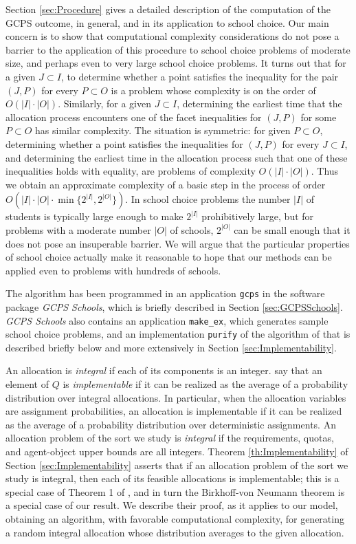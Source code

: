 \documentclass[12pt]{article}
\theoremstyle{definition}
\begin{document}
Section \ref{sec:Procedure} gives a detailed description of the computation of the GCPS outcome, in general, and in its application to school choice.  Our main concern is to show that computational complexity considerations do not pose a barrier to the application of this procedure to school choice problems of moderate size, and perhaps even to very large school choice problems.  
It turns out that for a given $J \subset I$, to determine whether a point satisfies the inequality for the pair $(J,P)$ for every $P \subset O$ is a problem whose complexity is on the order of $O(|I|\cdot|O|)$.  Similarly, for a given $J \subset I$, determining the earliest time that the allocation process encounters one of the facet inequalities for $(J,P)$ for some $P \subset O$ has similar complexity.  The situation is symmetric: for given $P \subset O$, determining whether a point satisfies the inequalities for $(J,P)$ for every $J \subset I$, and determining the earliest time in the allocation process such that one of these inequalities holds with equality, are problems of complexity  $O(|I|\cdot|O|)$.  Thus we obtain an approximate complexity of a basic step in the process of order $O(|I|\cdot|O|\cdot \min\{2^{|I|},2^{|O|}\})$.  In school choice problems the number $|I|$ of students is typically large enough to make $2^{|I|}$ prohibitively large, but for problems with a moderate number $|O|$ of schools, $2^{|O|}$ can be small enough that it does not pose an insuperable barrier.  We will argue that the particular properties of school choice actually make it reasonable to hope that our methods can be applied even to problems with hundreds of schools.

The algorithm has been programmed in an application \texttt{gcps} in the software package \emph{GCPS Schools}, which is briefly described in Section \ref{sec:GCPSSchools}.  \emph{GCPS Schools} also contains an application \texttt{make\_ex}, which generates sample school choice problems, and an implementation \texttt{purify} of the algorithm of \cite{bckm13aer} that is described briefly below and more extensively in Section \ref{sec:Implementability}.

An allocation is \emph{integral} if each of its components is an integer.
\cite{bckm13aer} say that an element of $Q$ is \emph{implementable} if it can be realized as the average of a probability distribution over integral allocations.    In particular, when the allocation variables are assignment probabilities, an allocation is implementable  if it can be realized as the average of a probability distribution over deterministic assignments.
An allocation problem of the sort we study is \emph{integral} if the requirements, quotas, and agent-object upper bounds are all integers. Theorem \ref{th:Implementability} of Section \ref{sec:Implementability} asserts that if an allocation problem of the sort we study is integral, then each of its feasible allocations is implementable; this is a special case of Theorem 1 of \cite{bckm13aer}, and in turn  the Birkhoff-von Neumann theorem is a special case of our result.  We describe their proof, as it applies to our model, obtaining an algorithm, with favorable computational complexity, for generating a random integral allocation whose distribution averages to the given allocation.   
\end{document}
